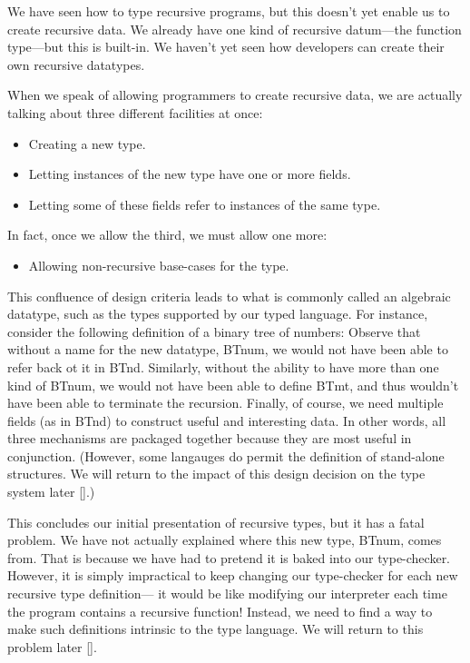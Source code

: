 
We have seen how to type recursive programs, but this doesn’t yet enable us to
create recursive data. We already have one kind of recursive datum—the function
type—but this is built-in. We haven’t yet seen how developers can create their
own recursive datatypes.

\secdown


When we speak of allowing programmers to create recursive data, we are actually
talking about three different facilities at once:
\begin{itemize}[nosep]
  \item 
Creating a new type.
  \item 
Letting instances of the new type have one or more fields.
  \item 
Letting some of these fields refer to instances of the same type.
\end{itemize}
In fact, once we allow the third, we must allow one more:
\begin{itemize}[nosep]
  \item Allowing non-recursive base-cases for the type.
\end{itemize}
This confluence of design criteria leads to what is commonly called an algebraic
datatype, such as the types supported by our typed language. For instance,
consider the following definition of a binary tree of numbers:
Observe that without a name for the new datatype, BTnum, we would not have been
able to refer back ot it in BTnd. Similarly, without the ability to have more
than one kind of BTnum, we would not have been able to define BTmt, and thus
wouldn’t have been able to terminate the recursion. Finally, of course, we need
multiple fields (as in BTnd) to construct useful and interesting data. In other
words, all three mechanisms are packaged together because they are most useful
in conjunction. (However, some langauges do permit the definition of stand-alone
structures. We will return to the impact of this design decision on the type
system later \ref{}.)

This concludes our initial presentation of recursive types, but it has a fatal
problem. We have not actually explained where this new type, BTnum, comes from.
That is because we have had to pretend it is baked into our type-checker.
However, it is simply impractical to keep changing our type-checker for each new
recursive type definition— it would be like modifying our interpreter each time
the program contains a recursive function! Instead, we need to find a way to
make such definitions intrinsic to the type language. We will return to this
problem later \ref{}.

